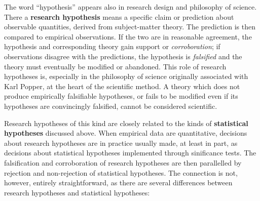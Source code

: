 \documentclass[11pt,a4paper,openany]{book}
\begin{document}
The word ``hypothesis'' appears also in research design and philosophy
of science. There a \textbf{research hypothesis} means a specific claim
or prediction about observable quantities, derived from subject-matter
theory. The prediction is then compared to empirical observations. If
the two are in reasonable agreement, the hypothesis and corresponding
theory gain support or \emph{corroboration}; if observations disagree
with the predictions, the hypothesis is \emph{falsified} and the theory
must eventually be modified or abandoned. This role of research
hypotheses is, especially in the philosophy of science originally
associated with Karl Popper, at the heart of the scientific method. A
theory which does not produce empirically falsifiable hypotheses, or
fails to be modified even if its hypotheses are convincingly falsified,
cannot be considered scientific.

Research hypotheses of this kind are closely related to the kinds of
\textbf{statistical hypotheses} discussed above. When empirical data are
quantitative, decisions about research hypotheses are in practice
usually made, at least in part, as decisions about statistical
hypotheses implemented through sinificance tests. The falsification and
corroboration of research hypotheses are then parallelled by rejection
and non-rejection of statistical hypotheses. The connection is not,
however, entirely straightforward, as there are several differences
between research hypotheses and statistical hypotheses:
\end{document}
